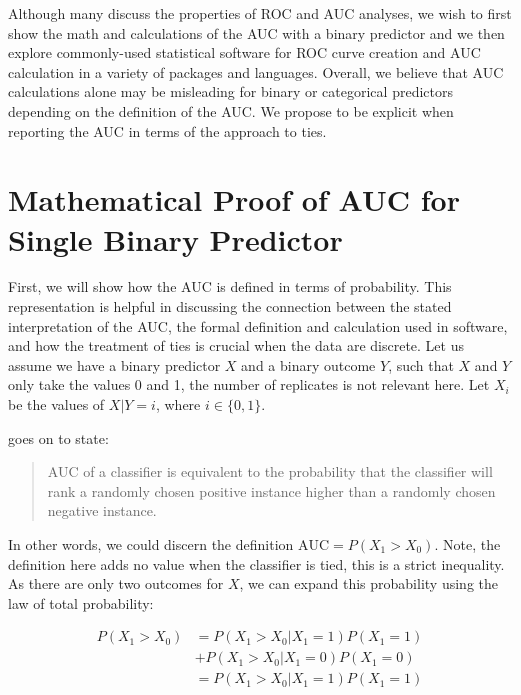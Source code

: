 \documentclass[article]{jss}
\begin{document}
Although many discuss the properties of ROC and AUC analyses, we wish to
first show the math and calculations of the AUC with a binary predictor
and we then explore commonly-used statistical software for ROC curve
creation and AUC calculation in a variety of packages and languages.
Overall, we believe that AUC calculations alone may be misleading for
binary or categorical predictors depending on the definition of the AUC.
We propose to be explicit when reporting the AUC in terms of the
approach to ties.

\hypertarget{mathematical-proof-of-auc-for-single-binary-predictor}{%
\section{Mathematical Proof of AUC for Single Binary
Predictor}\label{mathematical-proof-of-auc-for-single-binary-predictor}}

First, we will show how the AUC is defined in terms of probability. This
representation is helpful in discussing the connection between the
stated interpretation of the AUC, the formal definition and calculation
used in software, and how the treatment of ties is crucial when the data
are discrete. Let us assume we have a binary predictor \(X\) and a
binary outcome \(Y\), such that \(X\) and \(Y\) only take the values
\(0\) and 1, the number of replicates is not relevant here. Let
\(X_{i}\) be the values of \(X | Y = i\), where \(i \in \{0, 1\}\).

\citet{fawcett2006introduction} goes on to state:

\begin{quote}
AUC of a classifier is equivalent to the probability that the classifier
will rank a randomly chosen positive instance higher than a randomly
chosen negative instance.
\end{quote}

In other words, we could discern the definition
\(\text{AUC} = P(X_{1} > X_{0})\). Note, the definition here adds no
value when the classifier is tied, this is a strict inequality. As there
are only two outcomes for \(X\), we can expand this probability using
the law of total probability:

\begin{align}
P(X_{1} > X_{0}) &= P(X_{1} > X_{0} | X_{1} = 1) P(X_{1} = 1) \nonumber \\
&+ P(X_{1} > X_{0} | X_{1} = 0) P(X_{1} = 0) \label{eq:expand1} \\
&= P(X_{1} > X_{0} | X_{1} = 1) P(X_{1} = 1) \label{eq:expand}
\end{align}
\end{document}
